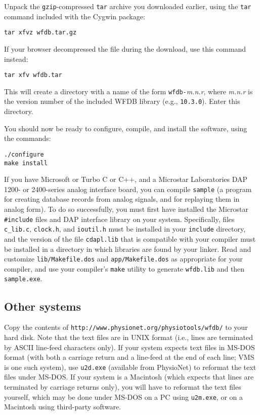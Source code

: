 \documentclass[twoside]{article}
\begin{document}
Unpack the {\tt gzip}-compressed {\tt tar} archive you downloaded earlier,
using the {\tt tar} command included with the Cygwin package:

\begin{verbatim}
tar xfvz wfdb.tar.gz
\end{verbatim}

If your browser decompressed the file during the download, use this command
instead:

\begin{verbatim}
tar xfv wfdb.tar
\end{verbatim}

This will create a directory with a name of the form {\tt wfdb-}{\em m.n.r},
where {\em m.n.r} is the version number of the included WFDB library (e.g.,
{\tt 10.3.0}).  Enter this directory.

You should now be ready to configure, compile, and install the software, using
the commands:

\begin{verbatim}
./configure
make install
\end{verbatim}

If you have Microsoft or Turbo C or C++, and a Microstar Laboratories DAP 1200-
or 2400-series analog interface board, you can compile {\tt sample} (a program
for creating database records from analog signals, and for replaying them in
analog form).  To do so successfully, you must first have installed the
Microstar {\tt \#include} files and DAP interface library on your system.
Specifically, files {\tt c\_lib.c}, {\tt clock.h}, and {\tt ioutil.h} must be
installed in your {\tt include} directory, and the version of the file
{\tt cdapl.lib} that is compatible with your compiler must be installed in a
directory in which libraries are found by your linker.  Read and customize
{\tt lib/Makefile.dos} and {\tt app/Makefile.dos} as appropriate for your
compiler, and use your compiler's {\tt make} utility to generate {\tt wfdb.lib}
and then {\tt sample.exe}.

\subsection*{Other systems}

Copy the contents of {\tt http://www.\-physio\-net.\-org/physio\-tools/wfdb/}
to your hard disk.  Note that the text files are in UNIX format (i.e., lines
are terminated by ASCII line-feed characters only).  If your system expects
text files in MS-DOS format (with both a carriage return and a line-feed at the
end of each line; VMS is one such system), use {\tt u2d.exe} (available from
PhysioNet) to reformat the text files under MS-DOS.  If your system is a
Macintosh (which expects that lines are terminated by carriage returns only),
you will have to reformat the text files yourself, which may be done under
MS-DOS on a PC using {\tt u2m.exe}, or on a Macintosh using third-party
software.
\end{document}
